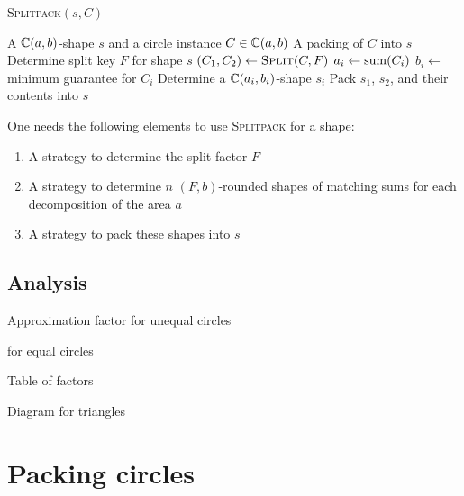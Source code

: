 \documentclass[a4paper,style=print,bibliography=totoc,nexus,lnum,extramargin]{tubsbook}
\begin{document}
\begin{algorithm}[htbp!]
    \caption{\textsc{Splitpack}$(s,C)$}
    \begin{algorithmic}
        \Require A $\mathbb{C}(a,b)$-shape $s$ and a circle instance $C \in \mathbb{C}(a,b)$
        \Ensure A packing of $C$ into $s$
        \State Determine split key $F$ for shape $s$
        \State $(C_1, C_2) \gets \textsc{Split}(C,F)$
            \State $a_i \gets \operatorname{sum}(C_i)$
            \State $b_i \gets$ minimum guarantee for $C_i$
            \State Determine a $\mathbb{C}(a_i, b_i)$-shape $s_i$
            \State {}
        \EndFor
        \State Pack $s_1$, $s_2$, and their contents into $s$
    \end{algorithmic}
\end{algorithm}

One needs the following elements to use \textsc{Splitpack} for a shape:

\begin{enumerate}
    \item A strategy to determine the split factor $F$
    \item A strategy to determine $n$ $(F,b)$-rounded shapes of matching sums for each decomposition of the area $a$
    \item A strategy to pack these shapes into $s$
\end{enumerate}



\section{Analysis}

Approximation factor for unequal circles

for equal circles

Table of factors

Diagram for triangles

\chapter{Packing circles}
\end{document}
